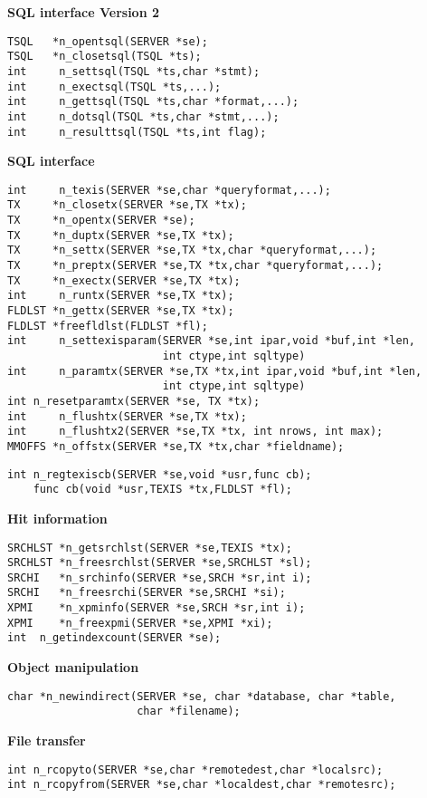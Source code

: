 {\bf SQL interface Version 2}
\begin{verbatim}
TSQL   *n_opentsql(SERVER *se);
TSQL   *n_closetsql(TSQL *ts);
int     n_settsql(TSQL *ts,char *stmt);
int     n_exectsql(TSQL *ts,...);
int     n_gettsql(TSQL *ts,char *format,...);
int     n_dotsql(TSQL *ts,char *stmt,...);
int     n_resulttsql(TSQL *ts,int flag);
\end{verbatim}

{\bf SQL interface}
\begin{verbatim}
int     n_texis(SERVER *se,char *queryformat,...);
TX     *n_closetx(SERVER *se,TX *tx);
TX     *n_opentx(SERVER *se);
TX     *n_duptx(SERVER *se,TX *tx);
TX     *n_settx(SERVER *se,TX *tx,char *queryformat,...);
TX     *n_preptx(SERVER *se,TX *tx,char *queryformat,...);
TX     *n_exectx(SERVER *se,TX *tx);
int     n_runtx(SERVER *se,TX *tx);
FLDLST *n_gettx(SERVER *se,TX *tx);
FLDLST *freefldlst(FLDLST *fl);
int     n_settexisparam(SERVER *se,int ipar,void *buf,int *len,
                        int ctype,int sqltype)
int     n_paramtx(SERVER *se,TX *tx,int ipar,void *buf,int *len,
                        int ctype,int sqltype)
int	n_resetparamtx(SERVER *se, TX *tx);
int     n_flushtx(SERVER *se,TX *tx);
int     n_flushtx2(SERVER *se,TX *tx, int nrows, int max);
MMOFFS *n_offstx(SERVER *se,TX *tx,char *fieldname);
\end{verbatim}
\begin{verbatim}
int n_regtexiscb(SERVER *se,void *usr,func cb);
    func cb(void *usr,TEXIS *tx,FLDLST *fl);
\end{verbatim}

{\bf Hit information }
\begin{verbatim}
SRCHLST *n_getsrchlst(SERVER *se,TEXIS *tx);
SRCHLST *n_freesrchlst(SERVER *se,SRCHLST *sl);
SRCHI   *n_srchinfo(SERVER *se,SRCH *sr,int i);
SRCHI   *n_freesrchi(SERVER *se,SRCHI *si);
XPMI    *n_xpminfo(SERVER *se,SRCH *sr,int i);
XPMI    *n_freexpmi(SERVER *se,XPMI *xi);
int	 n_getindexcount(SERVER *se);
\end{verbatim}

{\bf Object manipulation }
\begin{verbatim}
char *n_newindirect(SERVER *se, char *database, char *table,
                    char *filename);
\end{verbatim}

{\bf File transfer }
\begin{verbatim}
int n_rcopyto(SERVER *se,char *remotedest,char *localsrc);
int n_rcopyfrom(SERVER *se,char *localdest,char *remotesrc);
\end{verbatim}

